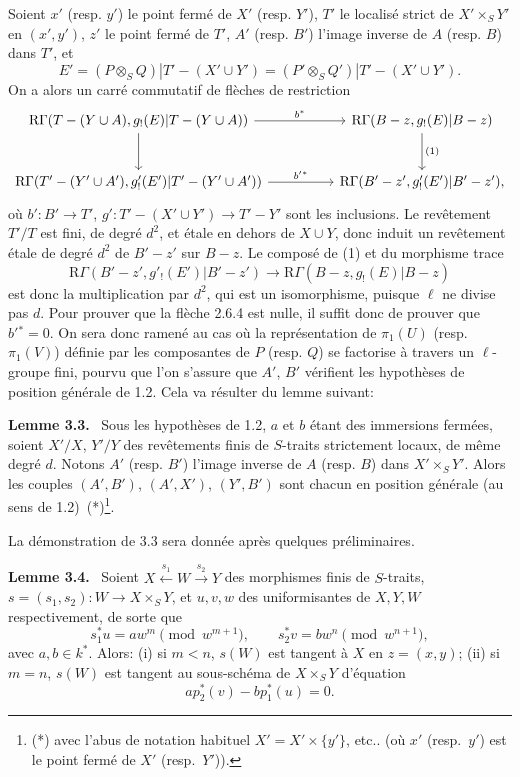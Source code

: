 \documentclass[11pt]{article}
\newenvironment{statement}[1]{\par\medskip\noindent\textbf{#1.}\ }{\par\medskip}
\begin{document}
Soient $x'$ (resp. $y'$) le point fermé de $X'$ (resp. $Y'$), $T'$ le localisé strict de $X'\times_S Y'$ en $(x',y')$, $z'$ le point fermé de $T'$, $A'$ (resp. $B'$) l'image inverse de $A$ (resp. $B$) dans $T'$, et
\[
E'=(P\otimes_S Q)|T'-(X'\cup Y')
   =(P'\otimes_S Q')|T'-(X'\cup Y').
\]
On a alors un carré commutatif de flèches de restriction
\[
\begin{tikzcd}[column sep=huge,row sep=large]
\mathrm R\Gamma(T-(Y\cup A),g_!(E)|T-(Y\cup A))
 \arrow[r,"b^*"] \arrow[d]
&
\mathrm R\Gamma(B-z,g_!(E)|B-z) \arrow[d,"(1)"]\\
\mathrm R\Gamma(T'-(Y'\cup A'),g'_!(E')|T'-(Y'\cup A'))
 \arrow[r,"b'{}^*"]
&
\mathrm R\Gamma(B'-z',g'_!(E')|B'-z') ,
\end{tikzcd}
\]
où $b':B'\to T'$, $g':T'-(X'\cup Y')\to T'-Y'$ sont les inclusions. Le revêtement $T'/T$ est fini, de degré $d^2$, et étale en dehors de $X\cup Y$, donc induit un revêtement étale de degré $d^2$ de $B'-z'$ sur $B-z$. Le composé de (1) et du morphisme trace
\[
\mathrm R\Gamma(B'-z',g'_!(E')|B'-z')
 \longrightarrow
\mathrm R\Gamma(B-z,g_!(E)|B-z)
\]
est donc la multiplication par $d^2$, qui est un isomorphisme, puisque $\ell$ ne divise pas $d$. Pour prouver que la flèche 2.6.4 est nulle, il suffit donc de prouver que $b'{}^*=0$. On sera donc ramené au cas où la représentation de $\pi_1(U)$ (resp. $\pi_1(V)$) définie par les composantes de $P$ (resp. $Q$) se factorise à travers un $\ell$-groupe fini, pourvu que l'on s'assure que $A'$, $B'$ vérifient les hypothèses de position générale de 1.2. Cela va résulter du lemme suivant:

\begin{statement}{Lemme 3.3}
Sous les hypothèses de 1.2, $a$ et $b$ étant des immersions fermées, soient $X'/X$, $Y'/Y$ des revêtements finis de $S$-traits strictement locaux, de même degré $d$. Notons $A'$ (resp. $B'$) l'image inverse de $A$ (resp. $B$) dans $X'\times_S Y'$. Alors les couples $(A',B')$, $(A',X')$, $(Y',B')$ sont chacun en position générale (au sens de 1.2)~(*)\footnote{(*) avec l'abus de notation habituel $X'=X'\times\{y'\}$, etc.. (où $x'$ (resp.\ $y'$) est le point fermé de $X'$ (resp.\ $Y'$)).}.
\end{statement}

La démonstration de 3.3 sera donnée après quelques préliminaires.

\begin{statement}{Lemme 3.4}
Soient $X\xleftarrow{s_1}W\xrightarrow{s_2}Y$ des morphismes finis de $S$-traits, $s=(s_1,s_2):W\to X\times_SY$, et $u,v,w$ des uniformisantes de $X,Y,W$ respectivement, de sorte que
\[
s_1^*u=aw^m\pmod {w^{m+1}},\qquad
s_2^*v=bw^n\pmod {w^{n+1}},
\]
avec $a,b\in k^*$. Alors: (i) si $m<n$, $s(W)$ est tangent à $X$ en $z=(x,y)$; (ii) si $m=n$, $s(W)$ est tangent au sous-schéma de $X\times_SY$ d'équation
\[
ap_2^*(v)-bp_1^*(u)=0.
\]
\end{statement}
\end{document}
